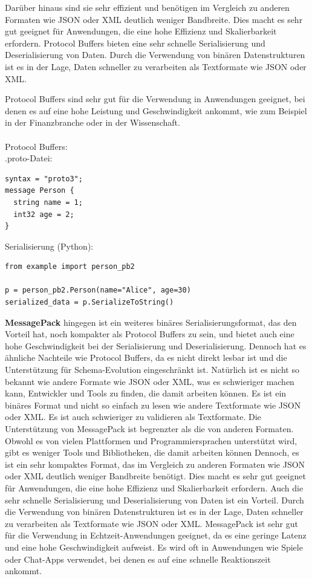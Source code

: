 Darüber hinaus sind sie sehr effizient und benötigen im Vergleich zu anderen Formaten wie JSON oder XML deutlich weniger Bandbreite. Dies macht es sehr gut geeignet für Anwendungen, die eine hohe Effizienz und Skalierbarkeit erfordern. Protocol Buffers bieten eine sehr schnelle Serialisierung und Deserialisierung von Daten. Durch die Verwendung von binären Datenstrukturen ist es in der Lage, Daten schneller zu verarbeiten als Textformate wie JSON oder XML.

Protocol Buffers sind sehr gut für die Verwendung in Anwendungen geeignet, bei denen es auf eine hohe Leistung und Geschwindigkeit ankommt, wie zum Beispiel in der Finanzbranche oder in der Wissenschaft.\\\\

Protocol Buffers:\\
.proto-Datei:\\
\begin{lstlisting}[caption={Protocol Buffers},captionpos=b,label={lst:buffers}]
syntax = "proto3";
message Person {
  string name = 1;
  int32 age = 2;
}
\end{lstlisting}
Serialisierung (Python):\\
\begin{lstlisting}[caption={Protocol Buffers (Python)},captionpos=b,label={lst:buffers_python}]
from example import person_pb2

p = person_pb2.Person(name="Alice", age=30)
serialized_data = p.SerializeToString()
\end{lstlisting}
\textbf{MessagePack} hingegen ist ein weiteres binäres Serialisierungsformat, das den Vorteil hat, noch kompakter als Protocol Buffers zu sein, und bietet auch eine hohe Geschwindigkeit bei der Serialisierung und Deserialisierung. Dennoch hat es ähnliche Nachteile wie Protocol Buffers, da es nicht direkt lesbar ist und die Unterstützung für Schema-Evolution eingeschränkt ist. Natürlich ist es nicht so bekannt wie andere Formate wie JSON oder XML, was es schwieriger machen kann, Entwickler und Tools zu finden, die damit arbeiten können. Es ist ein binäres Format und nicht so einfach zu lesen wie andere Textformate wie JSON oder XML. Es ist auch schwieriger zu validieren als Textformate.
Die Unterstützung von MessagePack ist begrenzter als die von anderen Formaten. Obwohl es von vielen Plattformen und Programmiersprachen unterstützt wird, gibt es weniger Tools und Bibliotheken, die damit arbeiten können Dennoch, es ist ein sehr kompaktes Format, das im Vergleich zu anderen Formaten wie JSON oder XML deutlich weniger Bandbreite benötigt. Dies macht es sehr gut geeignet für Anwendungen, die eine hohe Effizienz und Skalierbarkeit erfordern.
Auch die sehr schnelle Serialisierung und Deserialisierung von Daten ist ein Vorteil. Durch die Verwendung von binären Datenstrukturen ist es in der Lage, Daten schneller zu verarbeiten als Textformate wie JSON oder XML.
MessagePack ist sehr gut für die Verwendung in Echtzeit-Anwendungen geeignet, da es eine geringe Latenz und eine hohe Geschwindigkeit aufweist. Es wird oft in Anwendungen wie Spiele oder Chat-Apps verwendet, bei denen es auf eine schnelle Reaktionszeit ankommt.\\\\

